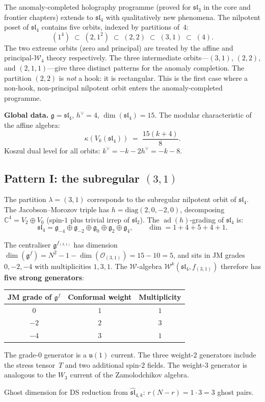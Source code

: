 \documentclass[11pt]{article}
\newcommand{\cO}{\mathcal{O}}
\newcommand{\cW}{\mathcal{W}}
\newcommand{\fg}{\mathfrak{g}}
\newcommand{\fsl}{\mathfrak{sl}}
\newcommand{\C}{\mathbb{C}}
\newcommand{\ad}{\operatorname{ad}}
\begin{document}
The anomaly-completed holography programme (proved for $\fsl_3$ in
the core and frontier chapters) extends to $\fsl_4$ with qualitatively
new phenomena.  The nilpotent poset of $\fsl_4$ contains five orbits,
indexed by partitions of~$4$:
\[
(1^4) \;\subset\; (2,1^2) \;\subset\; (2,2) \;\subset\; (3,1)
\;\subset\; (4).
\]
The two extreme orbits (zero and principal) are treated by the affine
and principal-$\cW_4$ theory respectively.  The three intermediate
orbits---$(3,1)$, $(2,2)$, and $(2,1,1)$---give three distinct
patterns for the anomaly completion.  The partition $(2,2)$ is
\emph{not} a hook: it is rectangular.  This is the first case where
a non-hook, non-principal nilpotent orbit enters the anomaly-completed
programme.

\medskip
\noindent\textbf{Global data.}
$\fg = \fsl_4$, $h^\vee = 4$, $\dim(\fsl_4) = 15$.
The modular characteristic of the affine algebra:
\begin{equation}\label{eq:kappa-sl4-km-wn}
\kappa(V_k(\fsl_4))
\;=\;
\frac{15(k+4)}{8}.
\end{equation}
Koszul dual level for all orbits: $k^\vee = -k - 2h^\vee = -k - 8$.

\subsection{Pattern I: the subregular $(3,1)$}
\label{subsec:sl4-hook-31-wn}

\begin{observation}
\label{obs:sl4-31-data-wn}
The partition $\lambda = (3,1)$ corresponds to the subregular nilpotent
orbit of $\fsl_4$.  The Jacobson--Morozov triple has
$h = \mathrm{diag}(2,0,-2,0)$, decomposing $\C^4 = V_2 \oplus V_0$
(spin-$1$ plus trivial irrep of $\fsl_2$).  The $\ad(h)$-grading of
$\fsl_4$ is:
\[
\fsl_4 = \fg_{-4} \oplus \fg_{-2} \oplus \fg_0 \oplus \fg_2 \oplus \fg_4,
\qquad
\dim = 1 + 4 + 5 + 4 + 1.
\]

The centraliser $\fg^{f_{(3,1)}}$ has dimension
$\dim(\fg^f) = N^2 - 1 - \dim(\cO_{(3,1)}) = 15 - 10 = 5$,
and sits in JM grades $0, -2, -4$ with multiplicities $1, 3, 1$.
The $\cW$-algebra $\cW^k(\fsl_4, f_{(3,1)})$ therefore has
\textbf{five strong generators}:
\begin{center}
\renewcommand{\arraystretch}{1.2}
\begin{tabular}{ccc}
\textbf{JM grade of $\fg^f$} & \textbf{Conformal weight}
  & \textbf{Multiplicity} \\
\hline
$0$ & $1$ & $1$ \\
$-2$ & $2$ & $3$ \\
$-4$ & $3$ & $1$
\end{tabular}
\end{center}
The grade-$0$ generator is a $\mathfrak{u}(1)$ current.  The three
weight-$2$ generators include the stress tensor~$T$ and two
additional spin-$2$ fields.  The weight-$3$ generator is analogous
to the $W_3$ current of the Zamolodchikov algebra.

Ghost dimension for DS reduction from $\widehat{\fsl}_{4,k}$:
$r(N{-}r) = 1 \cdot 3 = 3$ ghost pairs.
\end{observation}
\end{document}
